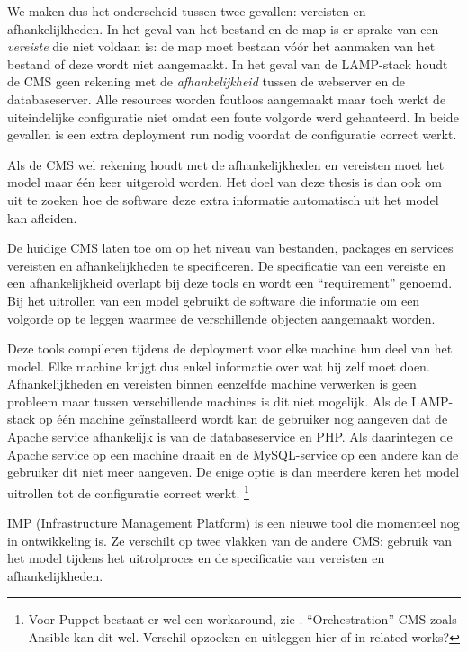 We maken dus het onderscheid tussen twee gevallen: vereisten en afhankelijkheden.
In het geval van het bestand en de map is er sprake van een \textit{vereiste} die niet voldaan is: de map moet bestaan v\'o\'or het aanmaken van het bestand of deze wordt niet aangemaakt.
In het geval van de LAMP-stack houdt de CMS geen rekening met de \textit{afhankelijkheid} tussen de webserver en de databaseserver.
Alle resources worden foutloos aangemaakt maar toch werkt de uiteindelijke configuratie niet omdat een foute volgorde werd gehanteerd.
In beide gevallen is een extra deployment run nodig voordat de configuratie correct werkt.

Als de CMS wel rekening houdt met de afhankelijkheden en vereisten moet het model maar \'e\'en keer uitgerold worden.
Het doel van deze thesis is dan ook om uit te zoeken hoe de software deze extra informatie automatisch uit het model kan afleiden.

De huidige CMS laten toe om op het niveau van bestanden, packages en services vereisten en afhankelijkheden te specificeren.
De specificatie van een vereiste en een afhankelijkheid overlapt bij deze tools en wordt een ``requirement'' genoemd.
Bij het uitrollen van een model gebruikt de software die informatie om een volgorde op te leggen waarmee de verschillende objecten aangemaakt worden.

Deze tools compileren tijdens de deployment voor elke machine hun deel van het model.
Elke machine krijgt dus enkel informatie over wat hij zelf moet doen.
Afhankelijkheden en vereisten binnen eenzelfde machine verwerken is geen probleem maar tussen verschillende machines is dit niet mogelijk.
Als de LAMP-stack op \'e\'en machine ge\"installeerd wordt kan de gebruiker nog aangeven dat de Apache service afhankelijk is van de databaseservice en PHP.
Als daarintegen de Apache service op een machine draait en de MySQL-service op een andere kan de gebruiker dit niet meer aangeven.
De enige optie is dan meerdere keren het model uitrollen tot de configuratie correct werkt.
\footnote{Voor Puppet bestaat er wel een workaround, zie \cite{puppet-orchestration}. ``Orchestration'' CMS zoals Ansible kan dit wel.  Verschil opzoeken en uitleggen hier of in related works?}

IMP (Infrastructure Management Platform) is een nieuwe tool die momenteel nog in ontwikkeling is.
Ze verschilt op twee vlakken van de andere CMS: gebruik van het model tijdens het uitrolproces en de specificatie van vereisten en afhankelijkheden.%

